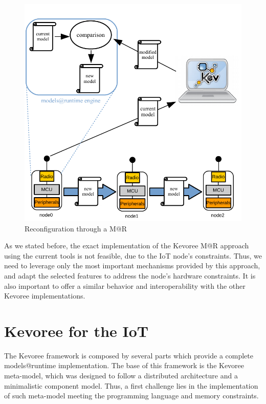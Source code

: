 \begin{figure}[]
	\centering
	\includegraphics[width=1\columnwidth]{chapters/modelsAtRuntimeContiki.images/reconfigMAR.pdf}
	\caption{Reconfiguration through a M@R}
	\label{fig:MAR_reconfig}
\end{figure}

As we stated before, the exact implementation of the Kevoree M@R approach using the current tools is not feasible, due to the IoT node's constraints.
Thus, we need to leverage only the most important mechanisms provided by this approach, and adapt the selected features to address the node's hardware constraints.
It is also important to offer a similar behavior and interoperability with the other Kevoree implementations.

\section{Kevoree for the IoT}
\label{sec:kevAndIoT}
The Kevoree framework is composed by several parts which provide a complete models@runtime implementation.
The base of this framework is the Kevoree meta-model, which was designed to follow a distributed architecture and a minimalistic component model.
Thus, a first challenge lies in the implementation of such meta-model meeting the programming language and memory constraints.

